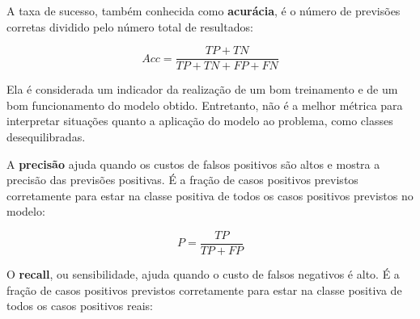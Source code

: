 \documentclass[portugues]{ic-tese}
\begin{document}
\begin{table}[h]
\label{tbl:ConfusionMatrix}
\begin{center}
  \caption{Matriz de confusão}
\end{center}
\end{table}

A taxa de sucesso, também conhecida como \textbf{acurácia}, é o número de previsões corretas dividido pelo número total de resultados:

\begin{equation}
Acc = \frac{TP + TN}{TP + TN + FP + FN}
\end{equation}

Ela é considerada um indicador da realização de um bom treinamento e de um bom funcionamento do modelo obtido. Entretanto, não é a melhor métrica para interpretar situações quanto a aplicação do modelo ao problema, como classes desequilibradas.

A \textbf{precisão} ajuda quando os custos de falsos positivos são altos e mostra a precisão das previsões positivas. É a fração de casos positivos previstos corretamente para estar na classe positiva de todos os casos positivos previstos no modelo:

\begin{equation}
P = \frac{TP}{TP + FP}
\end{equation}

O \textbf{recall}, ou sensibilidade, ajuda quando o custo de falsos negativos é alto.  É a fração de casos positivos previstos corretamente para estar na classe positiva de todos os casos positivos reais:
\end{document}
